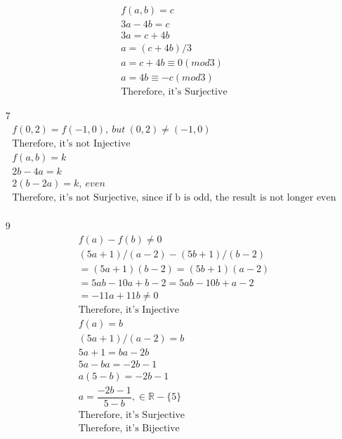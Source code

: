 \documentclass[12pt]{article}
\begin{document}
\begin{enumerate}
\begin{equation*}
\begin{split}
		    f(a, b) = c\\
		    3a-4b = c\\
		    3a=c + 4b\\
		    a = (c+4b)/3\\
		    a = c+4b \equiv 0 (mod 3)\\
		    a = 4b \equiv -c (mod 3)\\
		    \text{Therefore, it's Surjective}
	    	\end{split}
	    \end{equation*}
	\item [7]
	    \begin{equation*}
	    	\begin{split}
		    f(0,2) = f(-1,0),\ but\ (0,2) \ne (-1, 0)\\
		    \text{Therefore, it's not Injective}\\
		    f(a, b) = k\\
		    2b-4a = k\\
		    2(b-2a) = k,\ even\\
		    \text{Therefore, it's not Surjective, since if b is odd, the result is not longer even}\\
	    	\end{split}
	    \end{equation*}
	\item [9]
	    \begin{equation*}
	    	\begin{split}
		    f(a) - f(b) \ne 0\\
		    (5a+1)/(a-2) - (5b+1)/(b-2)\\
		    = (5a+1)(b-2) = (5b+1)(a-2)\\
		    = 5ab - 10a + b -2 = 5ab - 10b +a-2\\
		    = - 11a + 11b \ne 0\\
		    \text{Therefore, it's Injective}\\
		    f(a) = b\\
		    (5a+1)/(a-2) = b\\
		    5a+1 = ba - 2b\\
		    5a -ba = -2b -1\\
		    a(5-b) = -2b-1\\
		    a = \dfrac{-2b-1}{5-b}, \in \mathbb{R} - \{5\}\\
		    \text{Therefore, it's Surjective}\\
		    \text{Therefore, it's Bijective}\\
	    	\end{split}
	    \end{equation*}

\end{enumerate}
\end{document}
